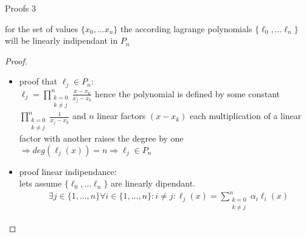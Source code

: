 \documentclass[8pt]{beamer}
\begin{document}
\begin{frame}{Proofs 3}
	\begin{theorem}
		for the set of values $\{x_0, \ldots x_n \}$ the according lagrange polynomials $\{\ell_0, \ldots \ell_n \}$ will be linearly indipendant in $P_n$
	\end{theorem}
	 \begin{proof}
		\begin{itemize}
			\item 
				proof that $\ell_j \in P_n$:\\
				$\displaystyle \ell_j = \prod_{\substack{k= 0 \\ k \neq j }}^{n}\frac{x - x_k}{x_j - x_k}$ hence the polynomial is defined by some constant $\displaystyle \prod_{\substack{k= 0 \\ k \neq j }}^{n}\frac{1}{x_j - x_k}$ and $ n$ linear factors $(x-x_k)$ each multiplication of a linear factor with another raises the degree by one $\Rightarrow deg(\ell_j(x)) = n \Rightarrow \ell_j \in P_n$
			 \item proof linear indipendance:\\
			 lets assume $\{\ell_0, \ldots \ell_n \}$ are linearly dipendant. 
			 \begin{align*}
			 	&\exists j \in \{1, \ldots ,n \} \forall i \in \{1, \ldots ,n \}: i \neq j: \ell_j(x) = \sum_{\substack{k= 0 \\ k \neq j }}^{n} \alpha_i\ell_i(x)
			 \end{align*}
		\end{itemize}
	 \end{proof}
\end{frame}
\end{document}

